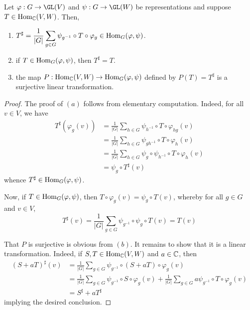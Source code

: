\begin{proposition}
    Let $\varphi: G\to\GL(V)$ and $\psi: G\to\GL(W)$ be representations and suppose $T\in\operatorname{Hom}_{\mathbb{C}}(V, W)$. Then, 
    \begin{enumerate}[label=(\alph*)]
        \item $\displaystyle T^\sharp = \frac{1}{|G|}\sum_{g\in G}\psi_{g^{-1}}\circ T\circ\varphi_g\in\operatorname{Hom}_G(\varphi,\psi)$.
        \item if $T\in\operatorname{Hom}_G(\varphi,\psi)$, then $T^\sharp = T$. 
        \item the map $P:\operatorname{Hom}_{\mathbb{C}}(V,W)\to\operatorname{Hom}_G(\varphi,\psi)$ defined by $P(T) = T^\sharp$ is a surjective linear transformation.
    \end{enumerate}
\end{proposition}
\begin{proof}
    The proof of $(a)$ follows from elementary computation. Indeed, for all $v\in V$, we have 
    \begin{align*}
        T^\sharp(\varphi_g(v)) &= \frac{1}{|G|}\sum_{h\in G}\psi_{h^{-1}}\circ T\circ\varphi_{hg}(v)\\
        &=\frac{1}{|G|}\sum_{h\in G}\psi_{gh^{-1}}\circ T\circ\varphi_{h}(v)\\
        &=\frac{1}{|G|}\sum_{h\in G}\psi_g\circ\psi_{h^{-1}}\circ T\circ\varphi_{h}(v)\\
        &=\psi_g\circ T^\sharp(v)
    \end{align*}
    whence $T^\sharp\in\operatorname{Hom}_G(\varphi,\psi)$.

    Now, if $T\in\operatorname{Hom}_G(\varphi,\psi)$, then $T\circ\varphi_g(v) = \psi_g\circ T(v)$, whereby for all $g\in G$ and $v\in V$,
    \begin{equation*}
        T^\sharp(v) = \frac{1}{|G|}\sum_{g\in G}\psi_{g^{-1}}\circ\psi_g\circ T(v) = T(v)
    \end{equation*}
    
    That $P$ is surjective is obvious from $(b)$. It remains to show that it is a linear transformation. Indeed, if $S,T\in\operatorname{Hom}_{\mathbb{C}}(V,W)$ and $a\in\mathbb{C}$, then 
    \begin{align*}
        (S + aT)^\sharp(v) &= \frac{1}{|G|}\sum_{g\in G}\psi_{g^{-1}}\circ(S + aT)\circ\varphi_g(v)\\
        &= \frac{1}{|G|}\sum_{g\in G}\psi_{g^{-1}}\circ S\circ\varphi_g(v) + \frac{1}{|G|}\sum_{g\in G}a\psi_{g^{-1}}\circ T\circ\varphi_g(v)\\
        &= S^\sharp + aT^\sharp
    \end{align*}
    implying the desired conclusion.
\end{proof}

